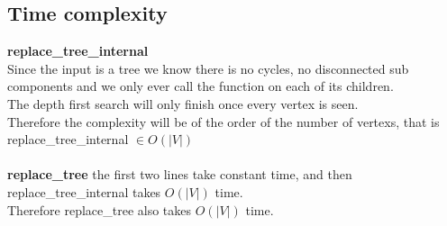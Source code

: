 \documentclass{article}
\begin{document}
    \subsection{Time complexity}
      \textbf{replace\_tree\_internal}\\
      Since the input is a tree we know there is no cycles, no disconnected sub components and we only ever call the function on each of its children.\\
      The depth first search will only finish once every vertex is seen. \\
      Therefore the complexity will be of the order of the number of vertexs, that is replace\_tree\_internal $\in O(|V|)$\\
      \\
      \textbf{replace\_tree}
      the first two lines take constant time, and then replace\_tree\_internal takes $O(|V|)$ time.\\
      Therefore replace\_tree also takes $O(|V|)$ time.
\end{document}
